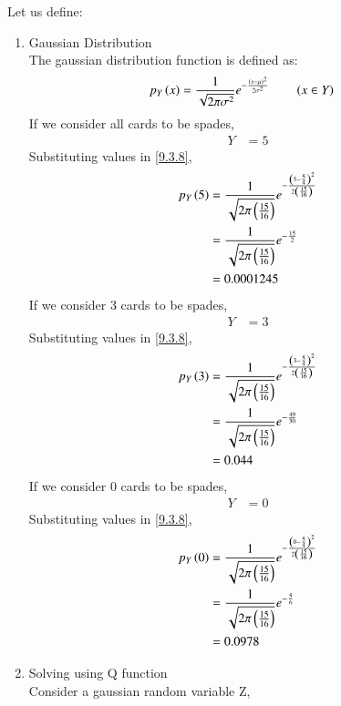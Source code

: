 \documentclass[journal,12pt,twocolumn]{IEEEtran}
\theoremstyle{remark}
\begin{document}
\solution
\fi
Let us define:
\begin{table}[!ht]

\end{table}
\begin{enumerate}[label=(\roman*)]
\item {Gaussian Distribution}\\
The gaussian distribution function is defined as:
\begin{align}
p_Y\brak{x} &= \frac{1}{\sqrt{2\pi{\sigma}^2}} e^{-\frac{\brak{x-\mu}^2}{2{\sigma}^2}}\label{9.3.8} \qquad \brak{x \in Y}
\end{align}
If we consider all cards to be spades,
\begin{align}
Y &= 5
\end{align}
Substituting values in \eqref{9.3.8},
\begin{align}
p_Y\left(5\right) &= \frac{1}{\sqrt{2\pi\left(\frac{15}{16}\right)}} e^{-\frac{\left(5 - \frac{5}{4}\right)^2}{2\left(\frac{15}{16}\right)}}\\
		   &= \frac{1}{\sqrt{2\pi\left(\frac{15}{16}\right)}} e^{-\frac{15}{2}}\\
	           &= 0.0001245
\end{align}
If we consider 3 cards to be spades,
\begin{align}
Y &= 3
\end{align}
Substituting values in \eqref{9.3.8},
\begin{align}
p_Y\left(3\right) &= \frac{1}{\sqrt{2\pi\left(\frac{15}{16}\right)}} e^{-\frac{\left(3 - \frac{5}{4}\right)^2}{2\left(\frac{15}{16}\right)}}\\
			      &= \frac{1}{\sqrt{2\pi\left(\frac{15}{16}\right)}} e^{-\frac{49}{30}}\\
			      &= 0.044
\end{align}
If we consider 0 cards to be spades,
\begin{align}
Y &= 0
\end{align}
Substituting values in \eqref{9.3.8},
\begin{align}
p_Y\left(0\right) &= \frac{1}{\sqrt{2\pi\left(\frac{15}{16}\right)}} e^{-\frac{\left(0 - \frac{5}{4}\right)^2}{2\left(\frac{15}{16}\right)}}\\
			       &= \frac{1}{\sqrt{2\pi\left(\frac{15}{16}\right)}} e^{-\frac{5}{6}}\\
			       &= 0.0978
\end{align}
\item Solving using Q function\\
Consider a gaussian random variable Z,
\begin{align}

\end{align}
\end{enumerate}
\end{document}
